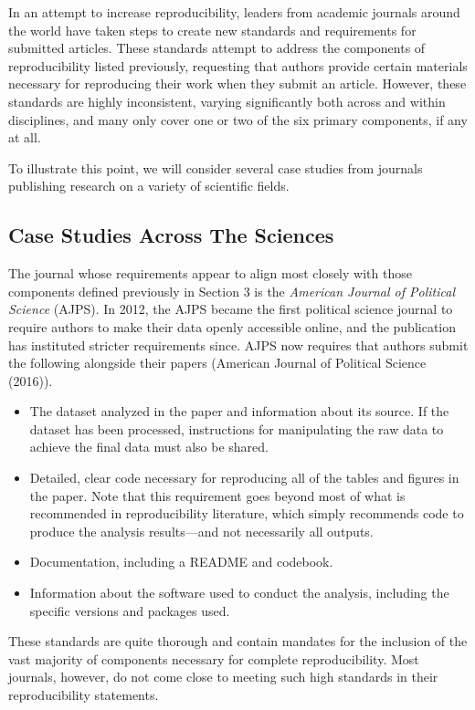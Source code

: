 \documentclass[12pt,twoside]{reedthesis}
\providecommand{\tightlist}{%
  \setlength{\itemsep}{0pt}\setlength{\parskip}{0pt}}
\begin{document}
In an attempt to increase reproducibility, leaders from academic journals around the world have taken steps to create new standards and requirements for submitted articles. These standards attempt to address the components of reproducibility listed previously, requesting that authors provide certain materials necessary for reproducing their work when they submit an article. However, these standards are highly inconsistent, varying significantly both across and within disciplines, and many only cover one or two of the six primary components, if any at all.

To illustrate this point, we will consider several case studies from journals publishing research on a variety of scientific fields.

\hypertarget{case-studies-across-the-sciences}{%
\subsection{Case Studies Across The Sciences}\label{case-studies-across-the-sciences}}

The journal whose requirements appear to align most closely with those components defined previously in Section 3 is the \emph{American Journal of Political Science} (AJPS). In 2012, the AJPS became the first political science journal to require authors to make their data openly accessible online, and the publication has instituted stricter requirements since. AJPS now requires that authors submit the following alongside their papers (American Journal of Political Science (2016)).
\begin{itemize}
\tightlist
\item
  The dataset analyzed in the paper and information about its source. If the dataset has been processed, instructions for manipulating the raw data to achieve the final data must also be shared.
\item
  Detailed, clear code necessary for reproducing all of the tables and figures in the paper. Note that this requirement goes beyond most of what is recommended in reproducibility literature, which simply recommends code to produce the analysis results---and not necessarily all outputs.
\item
  Documentation, including a README and codebook.
\item
  Information about the software used to conduct the analysis, including the specific versions and packages used.
\end{itemize}
These standards are quite thorough and contain mandates for the inclusion of the vast majority of components necessary for complete reproducibility. Most journals, however, do not come close to meeting such high standards in their reproducibility statements.
\end{document}

